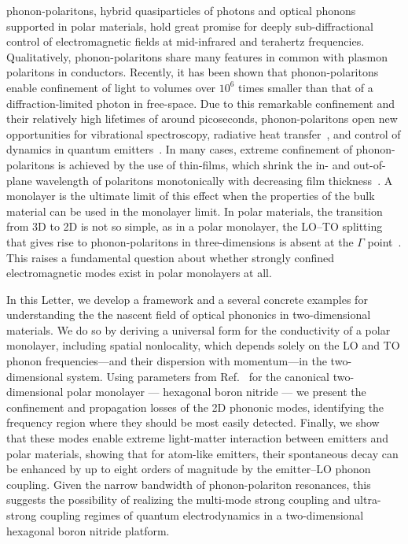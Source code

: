 \documentclass[aps,prb,twocolumn,
	           groupedaddress,superscriptaddress,
               amsfonts,amssymb,amsmath,floatfix,
	           citeautoscript]{revtex4-1}
\begin{document}
phonon-polaritons, hybrid quasiparticles of photons and optical phonons supported in polar materials, hold great promise for deeply sub-diffractional control of electromagnetic fields at mid-infrared and terahertz frequencies. Qualitatively, phonon-polaritons share many features in common with plasmon polaritons in conductors. Recently, it has been shown that phonon-polaritons enable confinement of light to volumes over $10^6$ times smaller than that of a diffraction-limited photon in free-space\cite{caldwell2013low,xu2014mid,caldwell2014sub,dai2014tunable,tomadin2015accessing,yoxall2015direct,li2015hyperbolic,dai2015subdiffractional,dai2015graphene,caldwell2015low,li2016reversible,Basov:2016,basov2017towards,low2017polaritons,giles2017ultra,li2018infrared,ma2018plane}. Due to this remarkable confinement and their relatively high lifetimes of around picoseconds, phonon-polaritons open new opportunities for vibrational spectroscopy,\cite{autore2018boron} radiative heat transfer~\cite{hillenbrand2002phonon}, and control of dynamics in quantum emitters~\cite{kumar2015tunable,rivera2017making,kurman2018control}. 
In many cases, extreme confinement of phonon-polaritons is achieved by the use of thin-films, which shrink the in- and out-of-plane wavelength of polaritons monotonically with decreasing film thickness~\cite{dai2014tunable,dubrovkin2018ultra}. A monolayer is the ultimate limit of this effect when the properties of the bulk material can be used in the monolayer limit. In polar materials, the transition from 3D to 2D is not so simple, as in a polar monolayer, the LO--TO splitting that gives rise to phonon-polaritons in three-dimensions is absent at the $\Gamma$ point~\cite{sanchez2002vibrational,mele2002electric,serrano2007vibrational,sohier2017breakdown}. This raises a fundamental question about whether strongly confined electromagnetic modes exist in polar monolayers at all. 

In this Letter, we develop a framework and a several concrete examples for understanding the the nascent field of optical phononics in two-dimensional materials. We do so by deriving a universal form for the conductivity of a polar monolayer, including spatial nonlocality, which depends solely on the LO and TO phonon frequencies---and their dispersion with momentum---in the two-dimensional system. Using parameters from Ref.~ for the canonical two-dimensional polar monolayer --- hexagonal boron nitride --- we present the confinement and propagation losses of the 2D phononic modes, identifying the frequency region where they should be most easily detected. Finally, we show that these modes enable extreme light-matter interaction between emitters and polar materials, showing that for atom-like emitters, their spontaneous decay can be enhanced by up to eight orders of magnitude by the emitter--LO phonon coupling. Given the narrow bandwidth of phonon-polariton resonances, this suggests the possibility of realizing the multi-mode strong coupling and ultra-strong coupling regimes of quantum electrodynamics in a two-dimensional hexagonal boron nitride platform. 
\end{document}
